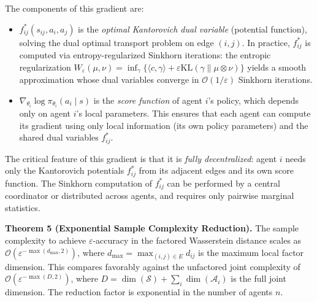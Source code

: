\documentclass[12pt,a4paper,oneside]{report}
\theoremstyle{definition}
\theoremstyle{remark}
\begin{document}
The components of this gradient are:
\begin{itemize}[leftmargin=2em]
  \item $f^*_{ij}(s_{ij}, a_i, a_j)$ is the \emph{optimal Kantorovich dual variable} (potential function), solving the dual optimal transport problem on edge $(i,j)$. In practice, $f^*_{ij}$ is computed via entropy-regularized Sinkhorn iterations: the entropic regularization $W_\varepsilon(\mu, \nu) = \inf_\gamma \{\langle c, \gamma \rangle + \varepsilon \text{KL}(\gamma \| \mu \otimes \nu)\}$ yields a smooth approximation whose dual variables converge in $\mathcal{O}(1/\varepsilon)$ Sinkhorn iterations.
  \item $\nabla_{\theta_i} \log \pi_{\theta_i}(a_i \mid s)$ is the \emph{score function} of agent $i$'s policy, which depends only on agent $i$'s local parameters. This ensures that each agent can compute its gradient using only local information (its own policy parameters) and the shared dual variables $f^*_{ij}$.
\end{itemize}

The critical feature of this gradient is that it is \emph{fully decentralized}: agent $i$ needs only the Kantorovich potentials $f^*_{ij}$ from its adjacent edges and its own score function. The Sinkhorn computation of $f^*_{ij}$ can be performed by a central coordinator or distributed across agents, and requires only pairwise marginal statistics.

\medskip
\textbf{Theorem 5 (Exponential Sample Complexity Reduction).} The sample complexity to achieve $\varepsilon$-accuracy in the factored Wasserstein distance scales as $\mathcal{O}(\varepsilon^{-\max(d_{\text{max}}, 2)})$, where $d_{\text{max}} = \max_{(i,j) \in E} d_{ij}$ is the maximum local factor dimension. This compares favorably against the unfactored joint complexity of $\mathcal{O}(\varepsilon^{-\max(D, 2)})$, where $D = \dim(\mathcal{S}) + \sum_i \dim(\mathcal{A}_i)$ is the full joint dimension. The reduction factor is exponential in the number of agents $n$.
\end{document}
